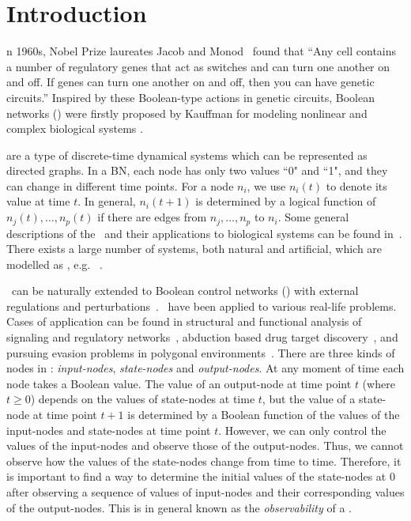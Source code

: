 

\section{Introduction}
\label{sec:intro}


n 1960s, Nobel Prize laureates Jacob and Monod~\cite{Jacob1961Genetic} found that ``Any cell contains a number of regulatory genes that act as switches and can turn one another on and off. If genes can turn one another on and off, then you can have genetic circuits.'' Inspired by these Boolean-type actions in genetic circuits, Boolean networks (\BNs) were firstly proposed by Kauffman for modeling nonlinear and complex biological systems \cite{Kauffman1968Metabolic}. 

{\BNs} are a type of discrete-time dynamical systems which can be represented as directed graphs. In a BN, each node has only two values ``0" and ``1", and they can change in different time points.  For a node $n_i$, we use $n_i(t)$ to denote its value at time $t$.
In general, $n_i(t+1)$ is determined by a logical function of $n_j(t),\ldots,n_p(t)$ if  there are  edges from $n_j,\ldots,n_p$ to $n_i$.  
Some general descriptions of the \BNs\ and their applications to biological systems can be found in~\cite{Kauffman1968Metabolic}. There exists a large number of  systems, both natural and artificial, which are modelled as \BNs, e.g. ~\cite{Akutsu2000Inferring, Shmulevich2002From, Faur2006Dynamical,Green2007The,Lou2010Multi}.

\BNs\ can be naturally extended to Boolean control networks (\BCNs) with external regulations and perturbations~\cite{Ideker2001A}. \BCNs\ have been applied to  various real-life problems. Cases of application can be found in 
structural and functional analysis of signaling and regulatory networks~\cite{Kaufman1999A, Klamt2006A}, 
abduction based drug target discovery~\cite{Biane2017Abduction}, 
and pursuing evasion problems in polygonal environments~\cite{Thunberg2011A}.
%
There are three kinds of nodes in \BCNs:  {\em input-nodes}, {\em state-nodes}  and {\em output-nodes}. At any moment of time each node takes a Boolean value.  The value of an output-node at time point $t$ (where $t\geq 0$)  depends on the values of state-nodes at time $t$, but the value of a  state-node at time point $t+1$  is determined by a  Boolean function of the values of the input-nodes and state-nodes at time point $t$. However,  we can only control the  values of the input-nodes and observe those of the output-nodes. Thus,  we cannot observe how   the values of the state-nodes change from time to time. Therefore, it is important to find a way to determine the initial values of the state-nodes at $0$ after observing a sequence of values of  input-nodes and their corresponding  values of the output-nodes. This is in general known as the {\em observability} of a \BCN.



